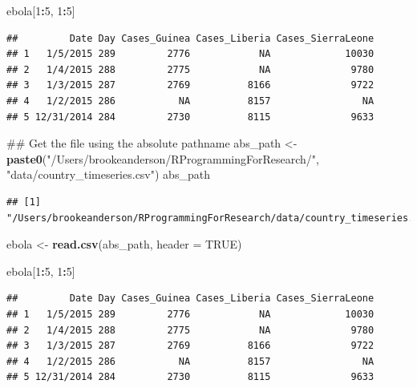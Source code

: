 \documentclass[]{book}
\makeatletter
\newenvironment{Shaded}{\begin{snugshade}}{\end{snugshade}}
\newcommand{\KeywordTok}[1]{\textcolor[rgb]{0.13,0.29,0.53}{\textbf{#1}}}
\newcommand{\DataTypeTok}[1]{\textcolor[rgb]{0.13,0.29,0.53}{#1}}
\newcommand{\DecValTok}[1]{\textcolor[rgb]{0.00,0.00,0.81}{#1}}
\newcommand{\StringTok}[1]{\textcolor[rgb]{0.31,0.60,0.02}{#1}}
\newcommand{\OtherTok}[1]{\textcolor[rgb]{0.56,0.35,0.01}{#1}}
\newcommand{\OperatorTok}[1]{\textcolor[rgb]{0.81,0.36,0.00}{\textbf{#1}}}
\newcommand{\NormalTok}[1]{#1}
\newenvironment{kframe}{%
\medskip{}
\setlength{\fboxsep}{.8em}
 \def\at@end@of@kframe{}%
 \ifinner\ifhmode%
  \def\at@end@of@kframe{\end{minipage}}%
  \begin{minipage}{\columnwidth}%
 \fi\fi%
 \def\FrameCommand##1{\hskip\@totalleftmargin \hskip-\fboxsep
 \colorbox{shadecolor}{##1}\hskip-\fboxsep
     \hskip-\linewidth \hskip-\@totalleftmargin \hskip\columnwidth}%
 \MakeFramed {\advance\hsize-\width
   \@totalleftmargin\z@ \linewidth\hsize
   \@setminipage}}%
 {\par\unskip\endMakeFramed%
 \at@end@of@kframe}
\renewenvironment{Shaded}{\begin{kframe}}{\end{kframe}}
\theoremstyle{definition}
\theoremstyle{definition}
\theoremstyle{definition}
\theoremstyle{remark}
\makeatother
\begin{document}
\begin{Shaded}
\begin{Highlighting}[]
\NormalTok{ebola[}\DecValTok{1}\OperatorTok{:}\DecValTok{5}\NormalTok{, }\DecValTok{1}\OperatorTok{:}\DecValTok{5}\NormalTok{]}
\end{Highlighting}
\end{Shaded}

\begin{verbatim}
##         Date Day Cases_Guinea Cases_Liberia Cases_SierraLeone
## 1   1/5/2015 289         2776            NA             10030
## 2   1/4/2015 288         2775            NA              9780
## 3   1/3/2015 287         2769          8166              9722
## 4   1/2/2015 286           NA          8157                NA
## 5 12/31/2014 284         2730          8115              9633
\end{verbatim}

\begin{Shaded}
\begin{Highlighting}[]
\NormalTok{## Get the file using the absolute pathname}
\NormalTok{abs_path <-}\StringTok{ }\KeywordTok{paste0}\NormalTok{(}\StringTok{"/Users/brookeanderson/RProgrammingForResearch/"}\NormalTok{,}
                   \StringTok{"data/country_timeseries.csv"}\NormalTok{)}
\NormalTok{abs_path}
\end{Highlighting}
\end{Shaded}

\begin{verbatim}
## [1] "/Users/brookeanderson/RProgrammingForResearch/data/country_timeseries.csv"
\end{verbatim}

\begin{Shaded}
\begin{Highlighting}[]
\NormalTok{ebola <-}\StringTok{ }\KeywordTok{read.csv}\NormalTok{(abs_path, }\DataTypeTok{header =} \OtherTok{TRUE}\NormalTok{) }
\end{Highlighting}
\end{Shaded}

\begin{Shaded}
\begin{Highlighting}[]
\NormalTok{ebola[}\DecValTok{1}\OperatorTok{:}\DecValTok{5}\NormalTok{, }\DecValTok{1}\OperatorTok{:}\DecValTok{5}\NormalTok{]}
\end{Highlighting}
\end{Shaded}

\begin{verbatim}
##         Date Day Cases_Guinea Cases_Liberia Cases_SierraLeone
## 1   1/5/2015 289         2776            NA             10030
## 2   1/4/2015 288         2775            NA              9780
## 3   1/3/2015 287         2769          8166              9722
## 4   1/2/2015 286           NA          8157                NA
## 5 12/31/2014 284         2730          8115              9633
\end{verbatim}
\end{document}
